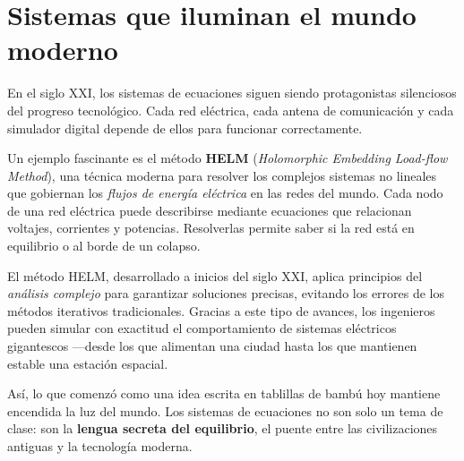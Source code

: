 \section*{Sistemas que iluminan el mundo moderno}

\begin{reseñaplana}
En el siglo XXI, los sistemas de ecuaciones siguen siendo protagonistas silenciosos del progreso tecnológico.  
Cada red eléctrica, cada antena de comunicación y cada simulador digital depende de ellos para funcionar correctamente.

Un ejemplo fascinante es el método \textbf{HELM} (\textit{Holomorphic Embedding Load-flow Method}), una técnica 
moderna para resolver los complejos sistemas no lineales que gobiernan los \textit{flujos de energía eléctrica} en las redes del mundo.  
Cada nodo de una red eléctrica puede describirse mediante ecuaciones que relacionan voltajes, corrientes y potencias.  
Resolverlas permite saber si la red está en equilibrio o al borde de un colapso.

El método HELM, desarrollado a inicios del siglo XXI, aplica principios del \textit{análisis complejo} para garantizar 
soluciones precisas, evitando los errores de los métodos iterativos tradicionales. Gracias a este tipo de avances, 
los ingenieros pueden simular con exactitud el comportamiento de sistemas eléctricos gigantescos —desde los que 
alimentan una ciudad hasta los que mantienen estable una estación espacial.

Así, lo que comenzó como una idea escrita en tablillas de bambú hoy mantiene encendida la luz del mundo.  
Los sistemas de ecuaciones no son solo un tema de clase: son la \textbf{lengua secreta del equilibrio}, el puente 
entre las civilizaciones antiguas y la tecnología moderna.
\end{reseñaplana}


